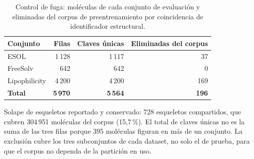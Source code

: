 \begin{table}[htbp]
  \centering
  \caption{Control de fuga: moléculas de cada conjunto de evaluación y
           eliminadas del corpus de preentrenamiento por coincidencia de
           identificador estructural.}
  \label{tab:a2-fuga}
  \small
  \begin{tabular}{@{}lrrr@{}}
    \toprule
    Conjunto & Filas & Claves únicas & Eliminadas del corpus \\
    \midrule
    ESOL          & 1\,128 & 1\,117 &  37 \\
    FreeSolv      &    642 &    642 &   0 \\
    Lipophilicity & 4\,200 & 4\,200 & 169 \\
    \midrule
    \textbf{Total} & \textbf{5\,970} & \textbf{5\,564} & \textbf{196} \\
    \bottomrule
  \end{tabular}

  \vspace{0.5em}
  \begin{minipage}{0.92\textwidth}
    \footnotesize
    Solape de esqueletos reportado y conservado: 728 esqueletos compartidos,
    que cubren 304\,951 moléculas del corpus (15,7\,\%).
    El total de claves únicas no es la suma de las tres filas porque 395 moléculas
    figuran en más de un conjunto. La exclusión cubre los tres subconjuntos de cada
    dataset, no solo el de prueba, para que el corpus no dependa de la partición en uso.
  \end{minipage}
\end{table}


